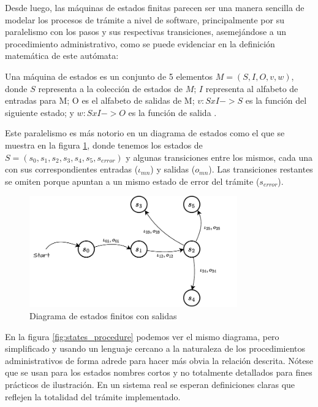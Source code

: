 Desde luego, las máquinas de estados finitas parecen ser una manera sencilla de
modelar los procesos de trámite a nivel de software, principalmente por su
paralelismo con los pasos y sus respectivas transiciones, asemejándose a un
procedimiento administrativo, como se puede evidenciar en la definición
matemática de este autómata:

\begin{definition}
	Una máquina de estados es un conjunto de 5 elementos $M=(S,I,O,v,w)$, donde
	$S$ representa a la colección de estados de $M$; $I$ representa al alfabeto
	de entradas para M; O es el alfabeto de salidas de M; $v:SxI->S$ es la
	función del siguiente estado; y $w:SxI->O$ es la función de salida
	\parencite{grimaldiDiscreteCombinatorialMathematics1998}.
\end{definition}

Este paralelismo es más notorio en un diagrama de estados como el que se muestra
en la figura \ref{fig:states}, donde tenemos los estados de $S = (s_{0}, s_{1},
s_{2}, s_{3}, s_{4}, s_{5}, s_{error})$ y algunas transiciones entre los mismos,
cada una con sus correspondientes entradas ($\iota_{mn}$) y salidas ($o_{mn}$).
Las transiciones restantes se omiten porque apuntan a un mismo estado de error
del trámite ($s_{error}$).

\begin{figure}[ht]
	\centering
	\includegraphics[width=0.8\textwidth]{assets/statediagramexample}
	\caption{Diagrama de estados finitos con salidas}
	\label{fig:states}
\end{figure}

En la figura \ref{fig:states_procedure} podemos ver el mismo diagrama, pero
simplificado y usando un lenguaje cercano a la naturaleza de los procedimientos
administrativos de forma adrede para hacer más obvia la relación descrita.
Nótese que se usan para los estados nombres cortos y no totalmente detallados
para fines prácticos de ilustración. En un sistema real se esperan definiciones
claras que reflejen la totalidad del trámite implementado.

